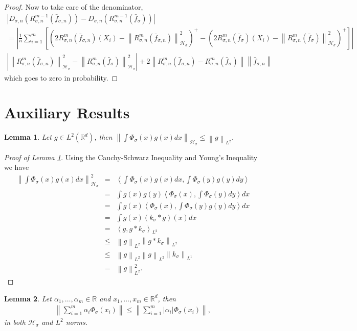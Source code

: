 \documentclass{article} %
\def\hsig{{\mathcal{H}_\sigma}}
\def\kde{{\bar{f}_{\sigma,n}}} %
\def\gkde{{\bar{f}_\sigma}} %
\def\fm{{\Phi_\sigma}} %
\def\rn{\mathbb{R}}
\def\l{\left}
\def\r{\right}
\newtheorem{lem}{Lemma}
\theoremstyle{definition}
\begin{document}
\begin{proof}
       Now to take care of the denominator,
        \begin{eqnarray*}
		\l| D_{\sigma,n}\left( R_{\sigma,n}^{m-1}\left( \kde \right) \right) - D_{\sigma,n}\left( R_{\sigma,n}^{m-1}\left( \gkde \right) \right) \r|  \\
		= \l| \frac{1}{n}\sum_{i=1}^m \l[\left( 2R_{\sigma,n}^m\left( \kde \right)(X_i) - \l\| R_{\sigma,n}^m\left( \kde \right)\r\|^2_\hsig \right)^+   -  \left( 2R_{\sigma,n}^m\left( \gkde \right)(X_i) - \l\| R_{\sigma,n}^m\left( \gkde \right)\r\|^2_\hsig \right)^+    \r]\r|\\
		  \left|  \l\| R_{\sigma,n}^m\left( \kde \right)\r\|^2_\hsig -  \l\| R_{\sigma,n}^m\left( \gkde \right)\r\|^2_\hsig \right|    + 2\l\|R_{\sigma,n}^m\left( \kde \right) -    R_{\sigma,n}^m\left( \gkde \right)\r\| \l\|\kde\r\| 
        \end{eqnarray*}
        which goes to zero in probability.
\end{proof}


\section{Auxiliary Results}
\begin{lem}\label{lem:l2hsigbnd}
	Let $g\in L^2\left( \rn^d \right)$, then $\l\|\int \fm(x) g(x) dx\r\|_\hsig \le \l\|g\r\|_{L^2}$.
\end{lem}
\begin{proof}[Proof of Lemma \ref{lem:l2hsigbnd}]
	Using the Cauchy-Schwarz Inequality and Young's Inequality we have
	\begin{eqnarray*}
		\l\|\int \fm(x) g(x) dx\r\|_\hsig^2
		&=&  \l<\int \fm(x) g(x) dx, \int \fm(y) g(y) dy\r>\\
		&=&  \int g(x)g(y)\l< \fm(x)  , \int \fm(y) dy \r>dx\\
		&=&  \int g(x)\l< \fm(x)  , \int \fm(y) g(y)dy \r>dx\\
		&=&  \int g(x) (k_\sigma \ast g)(x) dx\\
		&=& \l<g,g\ast k_\sigma\r>_{L^2}\\
		&\le& \l\|g\r\|_{L^2} \l\| g \ast k_\sigma\r\|_{L^2}\\
		&\le& \l\|g\r\|_{L^2} \l\| g  \r\|_{L^2} \l\|k_\sigma\r\|_{L^1}\\
		&=& \l\|g\r\|_{L^2}^2.
	\end{eqnarray*}
\end{proof}
\begin{lem}\label{lem:hilbabs}
	Let $\alpha_1,\ldots,\alpha_m \in \rn$ and $x_1,\ldots,x_m \in \rn^d$, then 
	\begin{eqnarray*}
		\l\|\sum_{i=1}^m \alpha_i \fm\left( x_i \right)\r\| \le \l\|\sum_{i=1}^m \l|\alpha_i\r| \fm\left( x_i \right)\r\|,
	\end{eqnarray*}
	in both $\hsig$ and $L^2$ norms.
\end{lem}
\end{document}
